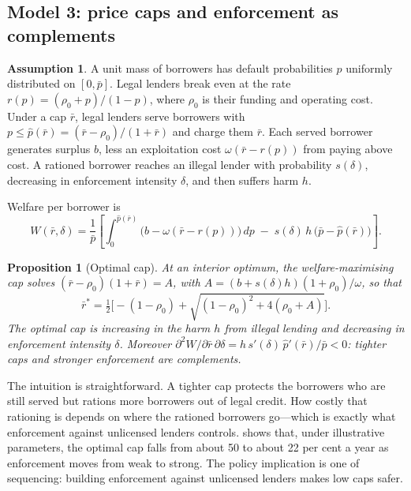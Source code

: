 \documentclass[11pt]{article}
\theoremstyle{plain}
\newtheorem{proposition}{Proposition}
\theoremstyle{definition}
\newtheorem{assumption}{Assumption}
\theoremstyle{remark}
\newcommand{\rbar}{\bar{r}}
\begin{document}
\subsection{Model 3: price caps and enforcement as complements}

\begin{assumption}\label{ass:m3}
A unit mass of borrowers has default probabilities $p$ uniformly distributed on $[0, \bar p]$. Legal lenders break even at the rate $r(p) = (\rho_0 + p)/(1-p)$, where $\rho_0$ is their funding and operating cost. Under a cap $\rbar$, legal lenders serve borrowers with $p \le \hat p(\rbar) = (\rbar-\rho_0)/(1+\rbar)$ and charge them $\rbar$. Each served borrower generates surplus $b$, less an exploitation cost $\omega(\rbar - r(p))$ from paying above cost. A rationed borrower reaches an illegal lender with probability $s(\delta)$, decreasing in enforcement intensity $\delta$, and then suffers harm $h$.
\end{assumption}

Welfare per borrower is
\begin{equation}
W(\rbar,\delta) = \frac{1}{\bar p}\left[\int_0^{\hat p(\rbar)} \big(b - \omega(\rbar - r(p))\big)\,dp \;-\; s(\delta)\,h\,\big(\bar p - \hat p(\rbar)\big)\right].
\label{eq:welfare}
\end{equation}

\begin{proposition}[Optimal cap]\label{prop:cap}
At an interior optimum, the welfare-maximising cap solves $(\rbar-\rho_0)(1+\rbar) = A$, with $A = (b + s(\delta)h)(1+\rho_0)/\omega$, so that
\begin{equation}
\rbar^* = \tfrac{1}{2}\Big[-(1-\rho_0) + \sqrt{(1-\rho_0)^2 + 4(\rho_0 + A)}\Big].
\label{eq:cap}
\end{equation}
The optimal cap is increasing in the harm $h$ from illegal lending and decreasing in enforcement intensity $\delta$. Moreover $\partial^2 W/\partial\rbar\,\partial\delta = h\,s'(\delta)\,\hat p'(\rbar)/\bar p < 0$: tighter caps and stronger enforcement are complements.
\end{proposition}

The intuition is straightforward. A tighter cap protects the borrowers who are still served but rations more borrowers out of legal credit. How costly that rationing is depends on where the rationed borrowers go---which is exactly what enforcement against unlicensed lenders controls.  shows that, under illustrative parameters, the optimal cap falls from about 50 to about 22 per cent a year as enforcement moves from weak to strong. The policy implication is one of sequencing: building enforcement against unlicensed lenders makes low caps safer.
\end{document}
